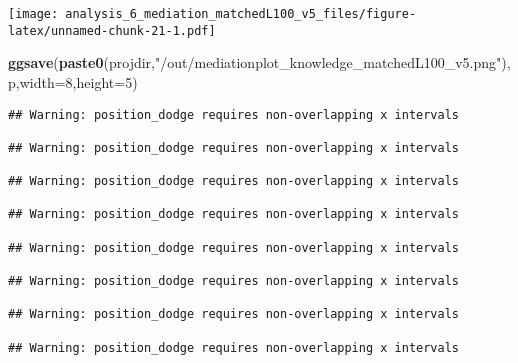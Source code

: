 \documentclass[
]{article}
\newenvironment{Shaded}{\begin{snugshade}}{\end{snugshade}}
\newcommand{\DataTypeTok}[1]{\textcolor[rgb]{0.13,0.29,0.53}{#1}}
\newcommand{\DecValTok}[1]{\textcolor[rgb]{0.00,0.00,0.81}{#1}}
\newcommand{\KeywordTok}[1]{\textcolor[rgb]{0.13,0.29,0.53}{\textbf{#1}}}
\newcommand{\NormalTok}[1]{#1}
\newcommand{\StringTok}[1]{\textcolor[rgb]{0.31,0.60,0.02}{#1}}
\begin{document}
\texttt{[image: analysis\_6\_mediation\_matchedL100\_v5\_files/figure-latex/unnamed-chunk-21-1.pdf]}

\begin{Shaded}
\begin{Highlighting}[]
\KeywordTok{ggsave}\NormalTok{(}\KeywordTok{paste0}\NormalTok{(projdir,}\StringTok{"/out/mediationplot_knowledge_matchedL100_v5.png"}\NormalTok{),p,}\DataTypeTok{width=}\DecValTok{8}\NormalTok{,}\DataTypeTok{height=}\DecValTok{5}\NormalTok{)}
\end{Highlighting}
\end{Shaded}

\begin{verbatim}
## Warning: position_dodge requires non-overlapping x intervals

## Warning: position_dodge requires non-overlapping x intervals

## Warning: position_dodge requires non-overlapping x intervals

## Warning: position_dodge requires non-overlapping x intervals

## Warning: position_dodge requires non-overlapping x intervals

## Warning: position_dodge requires non-overlapping x intervals

## Warning: position_dodge requires non-overlapping x intervals

## Warning: position_dodge requires non-overlapping x intervals
\end{verbatim}
\end{document}
